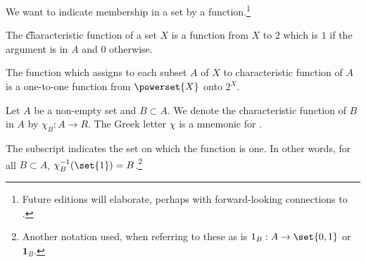 

We want to indicate membership in a set by a function.\footnote{Future editions will elaborate, perhaps with forward-looking connections to .}


The \t{characteristic function} of a set $X$ is a function from $X$ to $2$ which is $1$ if the argument is in $A$ and 0 otherwise.

The function which assigns to each subset $A$ of $X$ to characteristic function of $A$ is a one-to-one function from $\powerset{X}$ onto $2^{X}$.


Let $A$ be a non-empty
set and $B \subset A$.
We denote the characteristic
function of $B$ in $A$ by
$\chi_{B}: A \to R$.
The Greek letter $\chi$
is a mnemonic for
.

The subscript indicates
the set on which the function
is one.
In other words, for all $B \subset A$,
$\chi_{B}^{-1}(\set{1}) = B$.\footnote{Another notation used, when referring to these as  is $1_{B}: A \to \set{0, 1}$ or $\mathbf{1}_B$.}

\blankpage
